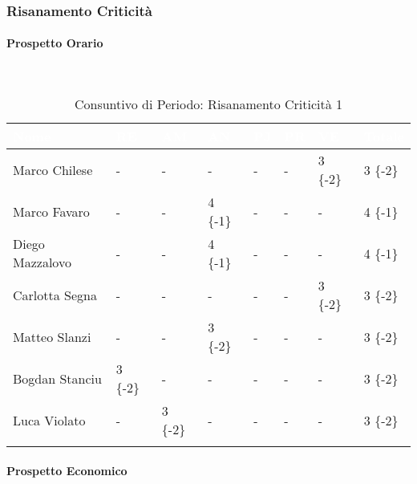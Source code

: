 \subsubsection{Risanamento Criticità}
\label{RA1}

\paragraph{Prospetto Orario} \-\\

\begin{longtable}{|C{.30\textwidth}|C{.06\textwidth}|C{.06\textwidth}|C{.06\textwidth} | C{.06\textwidth}| C{.06\textwidth} | C{.06\textwidth} | C{.10\textwidth} |}
\hline
{}	\textbf{\textcolor{white}{Nome}} & \textbf{\textcolor{white}{RE}} & \textbf{\textcolor{white}{AM}} & \textbf{\textcolor{white}{AN}} & \textbf{\textcolor{white}{PJ}} & \textbf{\textcolor{white}{PR}} & \textbf{\textcolor{white}{VE}} & \textbf{\textcolor{white}{Totale}}\\
\hline \hline

Marco Chilese & - & - & - & - & - & 3 \{-2\} & 3 \{-2\}\\
\hline
{}Marco Favaro & - & - & 4 \{-1\} & - & - & - & 4 \{-1\} \\
\hline
Diego Mazzalovo & - & - & 4 \{-1\} & - & - & - & 4 \{-1\} \\
\hline
{}Carlotta Segna & - & - & - & - & - & 3 \{-2\} & 3 \{-2\}\\
\hline
Matteo Slanzi & - & - & 3 \{-2\} & - & - & - & 3 \{-2\}\\
\hline
{}Bogdan Stanciu & 3 \{-2\} & - & - & - & - & - & 3 \{-2\} \\
\hline
Luca Violato & - & 3 \{-2\}& - & - & - & - & 3 \{-2\} \\
\hline

\caption{Consuntivo di Periodo: Risanamento Criticità 1}
\label{Distribuzione oraria del periodo di rc1}
\end{longtable}

\paragraph{Prospetto Economico} \-\\

